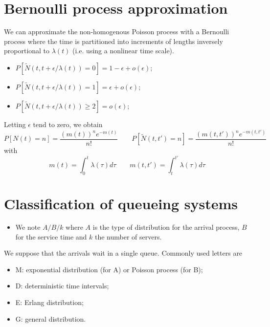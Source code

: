 \documentclass[12pt, openany]{report}
\theoremstyle{definition}
\begin{document}
\section{Bernoulli process approximation}
We can approximate the non-homogenous Poisson process with a Bernoulli process where the time is partitioned into increments of lengths inversely proportional to $\lambda (t)$ (i.e. using a nonlinear time scale).
\begin{itemize}
  \item $P[\tilde N(t,t+\epsilon/\lambda(t))=0]=1-\epsilon + o(\epsilon)$;
  \item $P[\tilde N(t,t+\epsilon/\lambda(t))=1]=\epsilon + o(\epsilon)$;
  \item $P[\tilde N(t,t+\epsilon/\lambda(t))\ge2]=o(\epsilon)$;
\end{itemize}
Letting $\epsilon$ tend to zero, we obtain
\begin{equation}
  P[N(t)=n]=\frac{(m(t))^ne^{-m(t)}}{n!}\qquad P[\tilde N(t,t')=n]=\frac{(m(t,t'))^n e^{-m(t,t')}}{n!}
\end{equation}
with 
\begin{equation}
  m(t)=\int_0^t \lambda(\tau)d\tau \qquad m(t,t')=\int_t^{t'} \lambda(\tau)d\tau 
\end{equation}
\section{Classification of queueing systems}
\begin{itemize}
  \item We note $A/B/k$ where $A$ is the type of distribution for the arrival process, $B$ for the service time and $k$ the number of servers.
\end{itemize}
We suppose that the arrivals wait in a single queue.
Commonly used letters are 
\begin{itemize}
  \item M: exponential distribution (for A) or Poisson process (for B);
  \item D: deterministic time intervals;
  \item E: Erlang distribution;
  \item G: general distribution.
\end{itemize}
\end{document}
